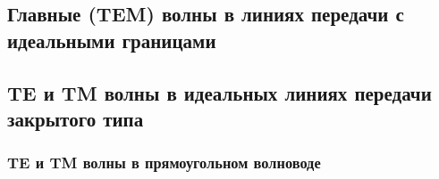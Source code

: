 \subsection{Главные (TEM) волны в линиях передачи с идеальными границами}

\subsection{TE и TM волны в идеальных линиях передачи закрытого типа}
\subsubsection{TE и TM волны в прямоугольном волноводе}